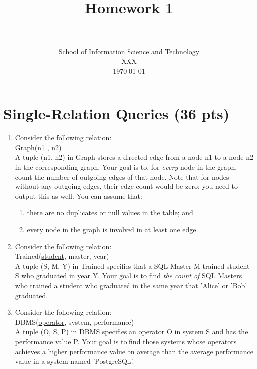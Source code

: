 \documentclass[paper=a4, fontsize=11pt]{scrartcl}
\title{
	\usefont{OT1}{bch}{b}{n}
	\horrule{0.5pt} \\[0.4cm]
	\huge Homework 1 \\
	\horrule{2pt} \\[0.5cm]
}
\author{
	\normalfont 								\normalsize
	School of Information Science and Technology \\
	\normalsize XXX\\[-3pt]		\normalsize
	\today
}
\date{}
\numberwithin{equation}{section}		%
\numberwithin{figure}{section}			%
\numberwithin{table}{section}				%
\begin{document}
	\maketitle
	
	\section{Single-Relation Queries (36 pts)}
	
	\begin{enumerate}
		\item Consider the following relation:\\
		Graph(n1 , n2)\\
		A tuple (n1, n2) in Graph stores a directed edge from a node n1 to a node n2 in the corresponding graph. Your goal is to, for \textit{every} node in the graph, count the number of outgoing edges of that node. Note that for nodes without any outgoing edges, their edge count would be zero; you need to output this as well.
		You can assume that:
		\begin{enumerate}
			\item there are no duplicates or null values in the table; and
			\item every node in the graph is involved in at least one edge.
		\end{enumerate}
		
		\item Consider the following relation:\\
		Trained(\underline{student}, master, year)\\
		A tuple (S, M, Y) in Trained specifies that a SQL Master M trained student S who graduated in year Y. Your goal is to find \textit{the count of} SQL Masters who trained a student who graduated in the same year that 'Alice' or 'Bob' graduated.\\
		
		\item Consider the following relation:\\
		DBMS(\underline{operator}, system, performance)\\
		A tuple (O, S, P) in DBMS specifies an operator O in system S and has the performance value P. Your goal is to find those systems whose operators achieves a higher performance value on average than the average performance value in a system named 'PostgreSQL'.\\
		
		
	\end{enumerate}
	
\end{document}
